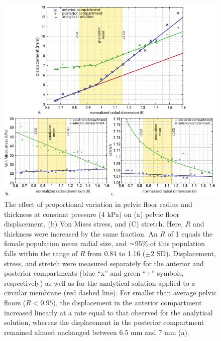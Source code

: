 \documentclass[9pt,twocolumn,twoside]{pnas-new}
\begin{document}
\begin{figure}
\centering
\includegraphics[width=\textwidth]{figs/fig4}
\caption{The effect of proportional variation in pelvic floor radius and thickness at constant pressure (4 kPa) on (a) pelvic floor displacement, (b) Von Mises
stress, and (C) stretch. Here, $R$ and thickness were increased by the same fraction. An $R$ of 1 equals the female population mean radial size, and ∼95\% of this
population falls within the range of $R$ from 0.84 to 1.16 ($\pm2$ SD). Displacement, stress, and stretch were measured separately for the anterior and posterior
compartments (blue ``x” and green ``+” symbols, respectively) as well as for the analytical solution applied to a circular membrane (red dashed line). For
smaller than average pelvic floors ($R < 0.95$), the displacement in the anterior compartment increased linearly at a rate equal to that observed for the analytical solution, whereas the displacement in the posterior compartment remained almost unchanged between 6.5 mm and 7 mm (a).}
\label{fig:isometry}
\end{figure}
\end{document}
